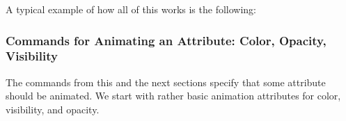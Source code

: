 A typical example of how all of this works is the following:
\begin{codeexample}
\pgfsys@animation@repeat@indefinite %
{
  \pgfsys@animation@whom{\someid}{}%
  \pgfsys@animatefillopacity%
}
{
  \pgfsys@animation@whom{\someid}{}%
  \pgfsys@animation@val@current %
  \pgfsys@animation@val@dimension{5pt} %
  \pgfsys@animatelinewidth%
}
\end{codeexample}




\subsubsection{Commands for Animating an Attribute: Color, Opacity, Visibility}

The commands from this and the next sections specify that some
attribute should be animated. We start with rather basic animation
attributes for color, visibility, and opacity.


